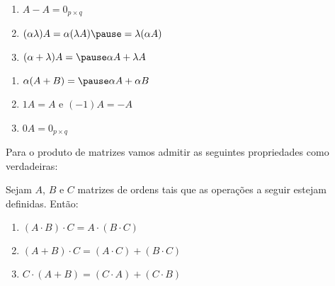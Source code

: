 \documentclass{beamer}
\begin{document}
    \begin{frame}
        \begin{proposicao}
            \begin{enumerate}[label={\roman*})]
                \conti
                \item $A - A = 0_{p \times q}$\pause
                \item $(\alpha\lambda) A = \alpha(\lambda A) \pause = \lambda(\alpha A)$\pause
                \item $(\alpha + \lambda)A = \pause \alpha A + \lambda A$
                \seti
            \end{enumerate}
        \end{proposicao}
    \end{frame}

    \begin{frame}
        \begin{proposicao}
            \begin{enumerate}[label={\roman*})]
                \conti
                \item $\alpha(A + B) = \pause \alpha A + \alpha B$\pause
                \item $1A = A$ e $(-1)A = -A$\pause
                \item  $0A = 0_{p \times q}$
            \end{enumerate}
        \end{proposicao}
    \end{frame}

    \begin{frame}
        Para o produto de matrizes vamos admitir as seguintes propriedades como verdadeiras:\pause
        \begin{proposicao}
	    Sejam $A$, $B$ e $C$ \pause matrizes de ordens tais que as operações a seguir estejam definidas. Ent\~ao:\pause
            \begin{enumerate}[label={\roman*})]
                \item $(A\cdot B)\cdot C = A\cdot(B \cdot C)$\pause
                \item $(A + B)\cdot C = (A\cdot C) + (B\cdot C)$\pause
                \item $C\cdot(A + B) = (C\cdot A) + (C\cdot B)$
                \seti
            \end{enumerate}
        \end{proposicao}
    \end{frame}
\end{document}

